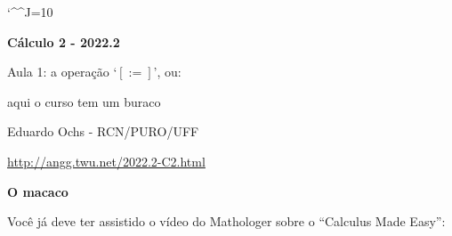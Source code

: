\documentclass[oneside,12pt]{article}
\begin{document}
\catcode`\^^J=10
\pu
\def\pictgridstyle{\color{GrayPale}\linethickness{0.3pt}}
\def\pictaxesstyle{\linethickness{0.5pt}}
\def\pictnaxesstyle{\color{GrayPale}\linethickness{0.5pt}}
\celllower=2.5pt


\def\u#1{\par{\footnotesize \url{#1}}}

\def\drafturl{http://angg.twu.net/LATEX/2022-2-C2.pdf}
\def\drafturl{http://angg.twu.net/2022.2-C2.html}
\def\draftfooter{\tiny \href{\drafturl}{\jobname{}} \ColorBrown{\shorttoday{} \hours}}



%

\thispagestyle{empty}

\begin{center}

\vspace*{1.2cm}

{\bf \Large Cálculo 2 - 2022.2}

\bsk

Aula 1: a operação `$[:=]$', ou:

aqui o curso tem um buraco

\bsk

Eduardo Ochs - RCN/PURO/UFF

\url{http://angg.twu.net/2022.2-C2.html}

\end{center}

\newpage

{\bf O macaco}

Você já deve ter assistido o vídeo do Mathologer sobre o ``Calculus
Made Easy'':

\ssk
\end{document}
